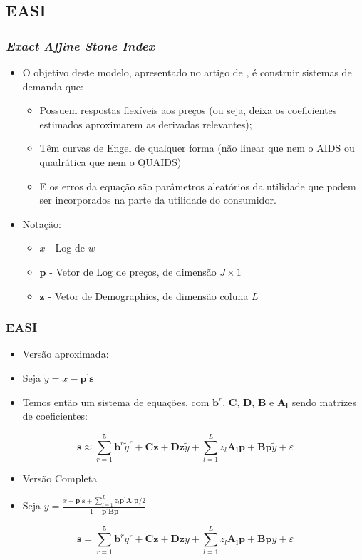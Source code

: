 \documentclass{beamer}
\begin{document}
\subsection{EASI}
\begin{frame}[fragile]\frametitle{\textit{Exact Affine Stone Index}}
\begin{itemize}
  \item O objetivo deste modelo, apresentado no artigo de \citet{Lewbel2009}, é construir sistemas de demanda que:
  \begin{itemize}
    \item Possuem respostas flexíveis aos preços (ou seja, deixa os coeficientes estimados aproximarem as derivadas relevantes);
    \item Têm curvas de Engel de qualquer forma (não linear que nem o AIDS ou quadrática que nem o QUAIDS)
    \item E os erros da equação são parâmetros aleatórios da utilidade que podem ser incorporados na parte da utilidade do consumidor.
  \end{itemize}
  \item Notação:
  \begin{itemize}
    \item $x$ - Log de $w$
    \item $\mathbf{p}$ - Vetor de Log de preços, de dimensão $J\times 1$
    \item $\mathbf{z}$ - Vetor de Demographics, de dimensão coluna $L$
  \end{itemize}
   
\end{itemize}
    


\end{frame}

\begin{frame}[fragile]\frametitle{EASI}
\begin{itemize}
  \item Versão aproximada:
  \item Seja $\tilde{y}=x-\mathbf{p}^{\prime} \bar{\mathbf{s}}$
  \item Temos então um sistema de equações, com $\mathbf{b}^{r}$, $\mathbf{C}$, $\mathbf{D}$, $\mathbf{B}$ e $\mathbf{A_{l}}$ sendo matrizes de coeficientes:
\end{itemize}
\[
\mathbf{s}\approx \sum_{r=1}^{5} \mathbf{b}^{r} \tilde{y}^{r}+\mathbf{Cz}+\mathbf{Dz}\tilde{y} + \sum_{l=1}^{L} z_{l} \mathbf{A_{l}p}+ \mathbf{Bp}\tilde{y}+\varepsilon
\]
\begin{itemize}
  \item Versão Completa
  \item Seja $y=\frac{x-\mathbf{p}^{\prime}\mathbf{s}+\sum_{l=1}^{L}z_{l}\mathbf{p^{\prime}A_{l}p}/2}{1-\mathbf{p^{\prime}Bp}}$
\end{itemize}
\[
\mathbf{s}= \sum_{r=1}^{5} \mathbf{b}^{r} y^{r}+\mathbf{Cz}+\mathbf{Dz}y + \sum_{l=1}^{L} z_{l} \mathbf{A_{l}p}+ \mathbf{Bp}y+\varepsilon
\]
    


\end{frame}
\end{document}

